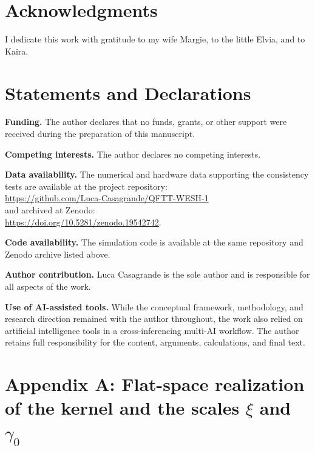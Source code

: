 \documentclass[12pt,a4paper]{article}
\numberwithin{equation}{section}
\begin{document}
\section*{Acknowledgments}

\noindent I dedicate this work with gratitude to my wife Margie, to the little Elvia, and to Ka\"ira.

\section*{Statements and Declarations}

\noindent\textbf{Funding.} The author declares that no funds, grants, or other support were received during the preparation of this manuscript.

\noindent\textbf{Competing interests.} The author declares no competing interests.

\noindent\textbf{Data availability.} The numerical and hardware data supporting the consistency tests are available at the project repository:\\
\url{https://github.com/Luca-Casagrande/QFTT-WESH-1}\\
and archived at Zenodo:\\
\url{https://doi.org/10.5281/zenodo.19542742}.

\noindent\textbf{Code availability.} The simulation code is available at the same repository and Zenodo archive listed above.

\noindent\textbf{Author contribution.} Luca Casagrande is the sole author and is responsible for all aspects of the work.

\noindent\textbf{Use of AI-assisted tools.} While the conceptual framework, methodology, and research direction remained with the author throughout, the work also relied on artificial intelligence tools in a cross-inferencing multi-AI workflow. The author retains full responsibility for the content, arguments, calculations, and final text.

\vspace{0.8cm}

\section*{Appendix A: Flat-space realization of the kernel and the scales \texorpdfstring{$\xi$}{ξ} and \texorpdfstring{$\gamma_0$}{γ0}}

\begingroup
\setcounter{equation}{0}
\renewcommand{\theequation}{A.\arabic{equation}}
\renewcommand{\theHequation}{A.\arabic{equation}}
\end{document}
